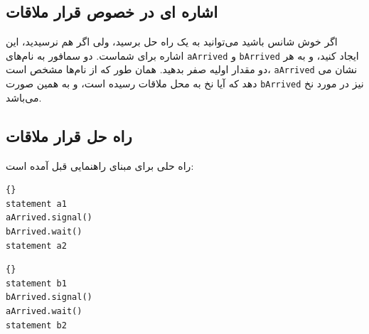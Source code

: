 \documentclass{book}
\newcommand{\clearemptydoublepage}{\newpage\cleardoublepage}
\begin{document}
\subsection{اشاره ای در خصوص قرار ملاقات}



اگر خوش شانس باشید می‌توانید به یک راه حل برسید، ولی اگر هم نرسیدید، این اشاره برای شماست. دو سمافور به 
نام‌های \texttt{aArrived} و \texttt{bArrived} ایجاد کنید، و به هر دو مقدار اولیه صفر بدهید. همان طور که از نام‌ها مشخص است، \texttt{aArrived} نشان می دهد که آیا نخ  به محل ملاقات رسیده است، و به همین صورت \texttt{bArrived} 
نیز در مورد نخ  می‌باشد.

\clearemptydoublepage
\subsection{راه حل قرار ملاقات }

    راه حلی برای مبنای راهنمایی قبل آمده است: 

\begin{latin}
\begin{minipage}[t]{2in}
\begin{latin}
\begin{lstlisting}[title=\rl{نخ \lr{A}}]{}
statement a1
aArrived.signal()
bArrived.wait()
statement a2
\end{lstlisting}
\end{latin}
\end{minipage}
\hfill
\begin{minipage}[t]{2in}
\begin{latin}
\begin{lstlisting}[title=\rl{نخ \lr{B}}]{}
statement b1
bArrived.signal()
aArrived.wait()
statement b2
\end{lstlisting}
\end{latin}
\end{minipage}
\end{latin}
\end{document}

